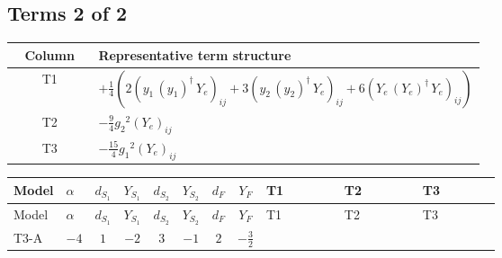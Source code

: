 \documentclass[8pt]{article}
\begin{document}
\begin{landscape}
\subsection*{Terms 2 of 2}
\begin{center}
\begin{tabular}{@{}c >{\raggedright\arraybackslash}p{0.82\linewidth}@{}}
\toprule
Column & Representative term structure \\
\midrule
T1 & \(\displaystyle +\frac{1}{4} (2 \left({y_1}\,\left({y_1}\right)^{\dagger}\,{Y_e}\right)_{ij}+3 \left({y_2}\,\left({y_2}\right)^{\dagger}\,{Y_e}\right)_{ij}+6 \left({Y_e}\,\left({Y_e}\right)^{\dagger}\,{Y_e}\right)_{ij})\) \\
\midrule
T2 & \(\displaystyle -\frac{9}{4} {g_2}^2 \left({Y_e}\right)_{ij}\) \\
\midrule
T3 & \(\displaystyle -\frac{15}{4} {g_1}^2 \left({Y_e}\right)_{ij}\) \\
\midrule
\bottomrule
\end{tabular}
\end{center}
\smallskip
\tiny
\begin{longtable}{@{}llcccccc >{\raggedright\arraybackslash}p{0.21\linewidth} >{\raggedright\arraybackslash}p{0.21\linewidth} >{\raggedright\arraybackslash}p{0.21\linewidth}@{}}
\toprule
Model & $\alpha$ & $d_{S_1}$ & $Y_{S_1}$ & $d_{S_2}$ & $Y_{S_2}$ & $d_F$ & $Y_F$ & T1 & T2 & T3 \\
\midrule
\endfirsthead
\toprule
Model & $\alpha$ & $d_{S_1}$ & $Y_{S_1}$ & $d_{S_2}$ & $Y_{S_2}$ & $d_F$ & $Y_F$ & T1 & T2 & T3 \\
\midrule
\endhead
T3-A & $-4$ & $1$ & $-2$ & $3$ & $-1$ & $2$ & $-\frac{3}{2}$ & \scriptsize\adjustbox{max width=\linewidth}{$\begin{gathered} +\frac{1}{4} (2 \left({y_1}\,\left({y_1}\right)^{\dagger}\,{Y_e}\right)_{ij}+3 \left({y_2}\,\left({y_2}\right)^{\dagger}\,{Y_e}\right)_{ij}+6 \left({Y_e}\,\left({Y_e}\right)^{\dagger}\,{Y_e}\right)_{ij})\end{gathered}$} & \scriptsize\adjustbox{max width=\linewidth}{$\begin{gathered} -\frac{9}{4} {g_2}^2 \left({Y_e}\right)_{ij}\end{gathered}$} & \scriptsize\adjustbox{max width=\linewidth}{$\begin{gathered} -\frac{15}{4} {g_1}^2 \left({Y_e}\right)_{ij}\end{gathered}$} \\
\midrule
\bottomrule
\end{longtable}
\clearpage

\end{landscape}
\end{document}
